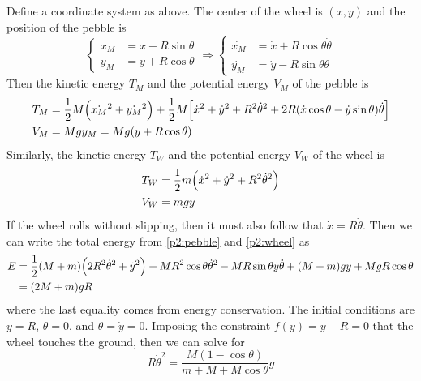 \documentclass[12pt]{article}
\begin{document}
\begin{problem}{2}
\begin{solution}
    Define a coordinate system as above. The center of the wheel is $(x,y)$ and
    the position of the pebble is
    \begin{equation}
        \begin{cases}
            x_M&=x+R\sin\theta\\
            y_M&=y+R\cos\theta
        \end{cases} 
        \Rightarrow
        \begin{cases}
            \dot{x_M}&=\dot{x}+R\cos\theta\dot\theta\\
            \dot{y_M}&=\dot{y}-R\sin\theta\dot\theta
        \end{cases}
    \end{equation}
    Then the kinetic energy $T_M$ and the potential energy $V_M$ of the pebble
    is
    \begin{subequations}\label{p2:pebble}
    \begin{align}
        T_M&=\frac12M\qty(\dot{x_M}^2+\dot{y_M}^2) 
        +\frac12M\qty[\dot{x}^2+\dot{y}^2+R^2\dot\theta^2
        +2R(\dot{x}\cos\theta-\dot{y}\sin\theta)\dot\theta
        ]\\
        V_M&=Mgy_M=Mg(y+R\cos\theta)
    \end{align} 
    \end{subequations}
    Similarly, the kinetic energy $T_W$ and the potential energy $V_W$ of the 
    wheel is
    \begin{subequations}\label{p2:wheel}
    \begin{align}
        T_W&=\frac12m\qty(\dot{x}^2+\dot{y}^2+R^2\dot\theta^2)\\
        V_W&=mgy       
    \end{align} 
    \end{subequations}
    If the wheel rolls without slipping, then it must also follow that
    $\dot{x}=R\dot\theta$. Then we can write the total energy from
    \eqref{p2:pebble} and \eqref{p2:wheel} as
    \begin{align}
        E&=\frac12\qty(M+m)\qty(2R^2\dot\theta^2+\dot{y}^2)+MR^2\cos\theta\dot\theta^2-MR\sin\theta\dot{y}\dot\theta+(M+m)gy+MgR\cos\theta\notag\\
         &=(2M+m)gR
    \end{align}
    where the last equality comes from energy conservation. The initial
    conditions are $y=R$, $\theta=0$, and $\dot\theta=\dot{y}=0$. Imposing the
    constraint $f(y)=y-R=0$ that the wheel touches the ground, then we can solve
    for
    \begin{equation}\label{p2:td}
        R\dot\theta^2=\frac{M(1-\cos\theta)}{m+M+M\cos\theta}g
    \end{equation}


\end{solution}
\end{problem}
\end{document}
